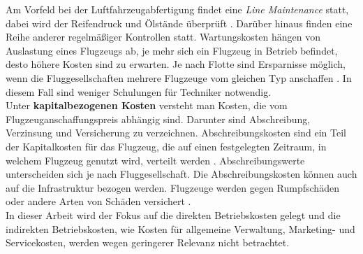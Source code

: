 Am Vorfeld bei der Luftfahrzeugabfertigung findet eine \textit{Line Maintenance} statt, 
dabei wird der Reifendruck und Ölstände überprüft \cite{conrady2019luftverkehr}. 
Darüber hinaus finden eine Reihe anderer regelmäßiger Kontrollen statt.
Wartungskosten hängen von Auslastung eines Flugzeugs ab, je mehr sich ein Flugzeug in Betrieb befindet, desto höhere 
Kosten sind zu erwarten. %
%
%
Je nach Flotte sind Ersparnisse möglich, wenn die Fluggesellschaften mehrere Flugzeuge vom gleichen Typ anschaffen \cite{conrady2019luftverkehr}. 
In diesem Fall sind weniger Schulungen für Techniker notwendig.\\
%
%
%
%
%
Unter \textbf{kapitalbezogenen Kosten} versteht man Kosten, die vom Flugzeuganschaffungspreis abhängig sind.
Darunter sind Abschreibung, Verzinsung und Versicherung zu verzeichnen.
Abschreibungskosten sind ein Teil der Kapitalkosten für das Flugzeug, 
die auf einen festgelegten Zeitraum, in welchem Flugzeug genutzt wird, verteilt werden \cite{conrady2019luftverkehr}.
Abschreibungswerte unterscheiden sich je nach Fluggesellschaft.
Die Abschreibungskosten können auch auf die Infrastruktur bezogen werden. 
Flugzeuge werden gegen Rumpfschäden oder andere Arten von Schäden versichert \cite{scholz_design_evaluation_doc}.  \\
%
%
%
In dieser Arbeit wird der Fokus auf die direkten Betriebskosten gelegt und die indirekten Betriebskosten, wie Kosten für 
allgemeine Verwaltung, Marketing- und Servicekosten, werden wegen geringerer Relevanz nicht betrachtet.\\
%
